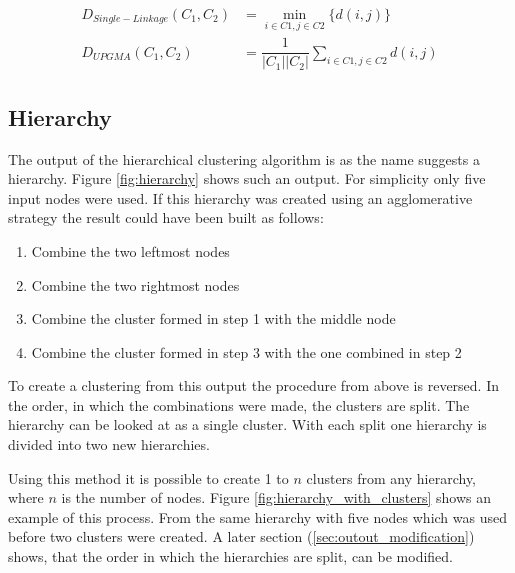 \begin{align}
    \label{eq:df_single_linkage}
    D_{Single-Linkage}(C_1, C_2) &= \min_{i\in{C1}, j\in{C2}}\{d(i, j)\} \\
    \label{eq:df_upgma}
    D_{UPGMA}(C_1, C_2) &= \dfrac{1}{|C_1||C_2|} \sum_{i\in{C1}, j\in{C2}}{d(i, j)}
\end{align}

\subsection{Hierarchy}
The output of the hierarchical clustering algorithm is as the name suggests a hierarchy. Figure \ref{fig:hierarchy} shows such an output. For simplicity only five input nodes were used. If this hierarchy was created using an agglomerative strategy the result could have been built as follows:

\begin{enumerate}
    \item Combine the two leftmost nodes
    \item Combine the two rightmost nodes
    \item Combine the cluster formed in step 1 with the middle node
    \item Combine the cluster formed in step 3 with the one combined in step 2
\end{enumerate}

To create a clustering from this output the procedure from above is reversed. In the order, in which the combinations were made, the clusters are split. The hierarchy can be looked at as a single cluster. With each split one hierarchy is divided into two new hierarchies.

Using this method it is possible to create 1 to $n$ clusters from any hierarchy, where $n$ is the number of nodes. Figure \ref{fig:hierarchy_with_clusters} shows an example of this process. From the same hierarchy with five nodes which was used before two clusters were created. A later section (\ref{sec:outout_modification}) shows, that the order in which the hierarchies are split, can be modified.

